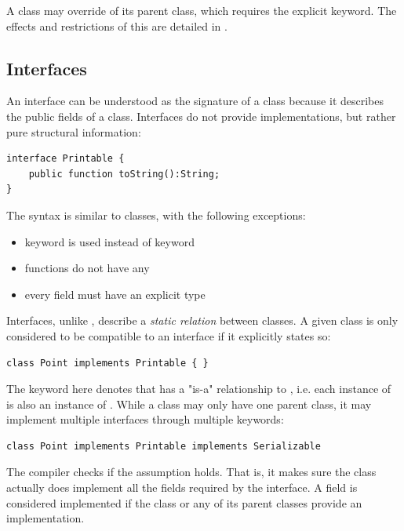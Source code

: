 \documentclass{haxe}
\begin{document}
A class may override  of its parent class, which requires the explicit  keyword. The effects and restrictions of this are detailed in .


\subsection{Interfaces}
\label{types-interfaces}

An interface can be understood as the signature of a class because it describes the public fields of a class. Interfaces do not provide implementations, but rather pure structural information:

\begin{lstlisting}
interface Printable {
	public function toString():String;
}
\end{lstlisting}
The syntax is similar to classes, with the following exceptions:

\begin{itemize}
	\item {} keyword is used instead of  keyword
	\item functions do not have any 
	\item every field must have an explicit type
\end{itemize}
Interfaces, unlike , describe a \emph{static relation} between classes. A given class is only considered to be compatible to an interface if it explicitly states so:

\begin{lstlisting}
class Point implements Printable { }
\end{lstlisting}
The  keyword here denotes that  has a "is-a" relationship to , i.e. each instance of  is also an instance of . While a class may only have one parent class, it may implement multiple interfaces through multiple  keywords:

\begin{lstlisting}
class Point implements Printable implements Serializable
\end{lstlisting}

The compiler checks if the  assumption holds. That is, it makes sure the class actually does implement all the fields required by the interface. A field is considered implemented if the class or any of its parent classes provide an implementation.
\end{document}
